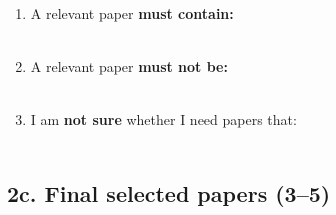 \begin{enumerate}
  \item A relevant paper \textbf{must contain:} \\[6pt]
        \underline{\hspace{13cm}} \\[4pt]
        \underline{\hspace{13cm}}
  \vspace{0.4cm}
  \item A relevant paper \textbf{must not be:} \\[6pt]
        \underline{\hspace{13cm}} \\[4pt]
        \underline{\hspace{13cm}}
  \vspace{0.4cm}
  \item I am \textbf{not sure} whether I need papers that: \\[6pt]
        \underline{\hspace{13cm}} \\[4pt]
        \underline{\hspace{13cm}}
\end{enumerate}

\subsection*{2c. Final selected papers (3--5)}


